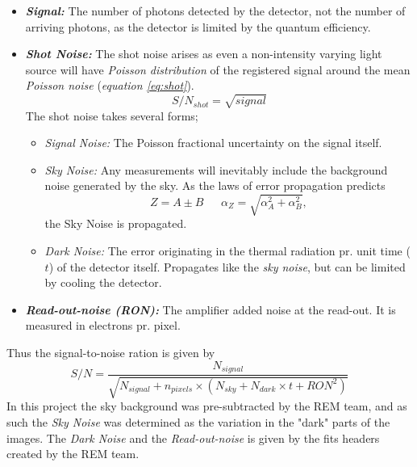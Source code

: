 \documentclass[a4paper, 12pt, twoside]{article}
\begin{document}
\begin{itemize}
\item {\bf \emph{Signal:}} The number of photons detected by the detector, not the number of arriving photons, as the detector is limited by the quantum efficiency.
\item {\bf \emph{Shot Noise:}} The shot noise arises as even a non-intensity varying light source will have \emph{Poisson distribution} of the registered signal around the mean \emph{Poisson noise} (\emph{equation \ref{eq:shot}}).
\begin{equation}
S/N_{shot} = \sqrt{signal}
\label{eq:shot}
\end{equation}
The shot noise takes several forms;
\begin{itemize}
\item \emph{Signal Noise:} The Poisson fractional uncertainty on the signal itself.
\item \emph{Sky Noise:} Any measurements will inevitably include the background noise generated by the sky. As the laws of error propagation predicts\cite{Hughes2010}
\begin{equation}
Z = A \pm B \ \ \ \ \ \ \ \alpha_{Z} = \sqrt{\alpha_{A}^{2} + \alpha_{B}^{2}},
\label{eq:error_minus}
\end{equation}
the Sky Noise is propagated.
\item \emph{Dark Noise:} The error originating in the thermal radiation pr. unit time ($t$) of the detector itself. Propagates like the \emph{sky noise}, but can be limited by cooling the detector. 
\end{itemize}
\item {\bf \emph{Read-out-noise (RON):}} The amplifier added noise at the read-out. It is measured in electrons pr. pixel.
\end{itemize}
Thus the signal-to-noise ration is given by
\begin{equation}
S/N = \frac{N_{signal}}{\sqrt{N_{signal}+n_{pixels}\times (N_{sky} + N_{dark}\times t + RON^{2})}}
\label{eq:SNR}
\end{equation}
In this project the sky background was pre-subtracted by the REM team, and as such the \emph{Sky Noise} was determined as the variation in the "dark" parts of the images. The \emph{Dark Noise} and the \emph{Read-out-noise} is given by the fits headers created by the REM team. 
\end{document}
